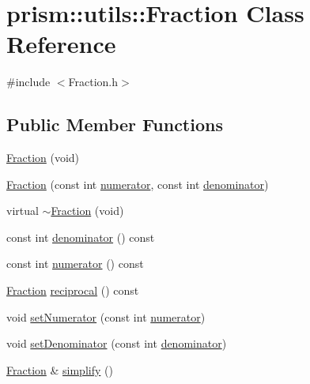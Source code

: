 \hypertarget{classprism_1_1utils_1_1_fraction}{}\section{prism\+:\+:utils\+:\+:Fraction Class Reference}
\label{classprism_1_1utils_1_1_fraction}


{\ttfamily \#include $<$Fraction.\+h$>$}

\subsection*{Public Member Functions}
\begin{DoxyCompactItemize}
\item 
\hyperlink{classprism_1_1utils_1_1_fraction_a3f49d633d81da4cfdcb9ed254fd2f6b4}{Fraction} (void)
\item 
\hyperlink{classprism_1_1utils_1_1_fraction_a974e11e4b34c9acf5660d2b162ce75c6}{Fraction} (const int \hyperlink{classprism_1_1utils_1_1_fraction_aaacc24209bd619048a5e5349c658e1b5}{numerator}, const int \hyperlink{classprism_1_1utils_1_1_fraction_a5a48def1833f80869aa0311ad0f7ca45}{denominator})
\item 
virtual \hyperlink{classprism_1_1utils_1_1_fraction_aeeee544b74bd5c7fcebf2d3031e6af54}{$\sim$\+Fraction} (void)
\item 
const int \hyperlink{classprism_1_1utils_1_1_fraction_a5a48def1833f80869aa0311ad0f7ca45}{denominator} () const 
\item 
const int \hyperlink{classprism_1_1utils_1_1_fraction_aaacc24209bd619048a5e5349c658e1b5}{numerator} () const 
\item 
\hyperlink{classprism_1_1utils_1_1_fraction}{Fraction} \hyperlink{classprism_1_1utils_1_1_fraction_a6351fa05c821e6f4c1cd2f5332d179e7}{reciprocal} () const 
\item 
void \hyperlink{classprism_1_1utils_1_1_fraction_a9c32592dd8db6178416c24396a8af35f}{set\+Numerator} (const int \hyperlink{classprism_1_1utils_1_1_fraction_aaacc24209bd619048a5e5349c658e1b5}{numerator})
\item 
void \hyperlink{classprism_1_1utils_1_1_fraction_a4e32674efe260698b75f7a95a1d9ae1e}{set\+Denominator} (const int \hyperlink{classprism_1_1utils_1_1_fraction_a5a48def1833f80869aa0311ad0f7ca45}{denominator})
\item 
\hyperlink{classprism_1_1utils_1_1_fraction}{Fraction} \& \hyperlink{classprism_1_1utils_1_1_fraction_a2ffadaf23c1bd5d514e9f9216b52ccec}{simplify} ()
\end{DoxyCompactItemize}

